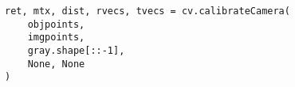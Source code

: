 \begin{lstlisting}
ret, mtx, dist, rvecs, tvecs = cv.calibrateCamera(
    objpoints, 
    imgpoints, 
    gray.shape[::-1], 
    None, None
)
\end{lstlisting}